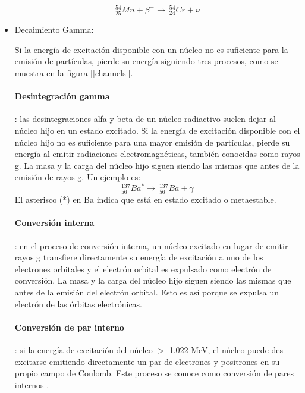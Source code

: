 \begin{itemize}
    	\begin{equation}
    		^{54} _{25} Mn + \beta ^{-}  \longrightarrow \  ^{54} _{24} Cr + \nu 
    	\end{equation}
    	
 
	\item Decaimiento Gamma:
	
	\noindent Si la energía de excitación disponible con un núcleo no es suficiente para la emisión de partículas, pierde su energía siguiendo tres procesos, como se muestra en la figura [\ref{channels}]. 
	
        \paragraph{Desintegración gamma}: las desintegraciones alfa y beta de un núcleo radiactivo suelen dejar al núcleo hijo en un estado excitado. Si la energía de excitación disponible con el núcleo hijo no es suficiente para una mayor emisión de partículas, pierde su energía al emitir radiaciones electromagnéticas, también conocidas como rayos g. La masa y la carga del núcleo hijo siguen siendo las mismas que antes de la emisión de rayos g. Un ejemplo es: 
    		\begin{equation}
    		^{137} _{56} Ba^{*} \longrightarrow \ ^{137} _{56} Ba + \gamma  
    		\end{equation}
    		El asterisco (*) en Ba indica que está en estado excitado o metaestable.
    		
    		\paragraph{Conversión interna}: en el proceso de conversión interna, un núcleo excitado en lugar de emitir rayos g transfiere directamente su energía de excitación a uno de los electrones orbitales y el electrón orbital es expulsado como electrón de conversión. La masa y la carga del núcleo hijo siguen siendo las mismas que antes de la emisión del electrón orbital. Esto es así porque se expulsa un electrón de las órbitas electrónicas.
    		\paragraph{Conversión de par interno}: si la energía de excitación del núcleo $>$ 1.022 MeV, el núcleo puede des-excitarse emitiendo directamente un par de electrones y positrones en su propio campo de Coulomb. Este proceso se conoce como conversión de pares internos \cite{Podgorsak.2016}.
\end{itemize}


